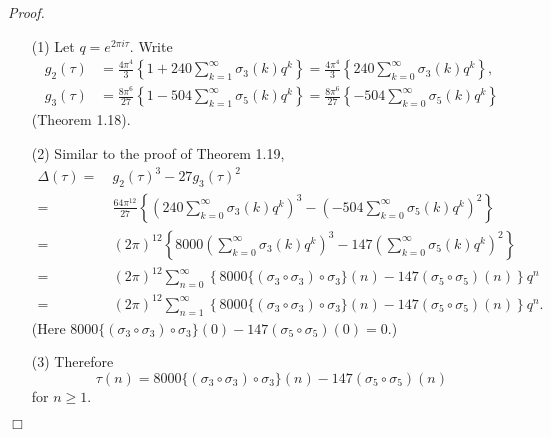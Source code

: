 \documentclass{article}
\begin{document}
\emph{Proof.}
\begin{enumerate}
\item[(1)]
  Let $q = e^{2 \pi i \tau}$.
  Write
  \begin{align*}
    g_2(\tau)
    &=
    \frac{4\pi^4}{3} \left\{ 1 + 240 \sum_{k=1}^{\infty} \sigma_3(k) q^k \right\}
    = \frac{4\pi^4}{3} \left\{ 240 \sum_{k=0}^{\infty} \sigma_3(k) q^k \right\}, \\
    g_3(\tau)
    &=
    \frac{8\pi^6}{27} \left\{ 1 - 504 \sum_{k=1}^{\infty} \sigma_5(k) q^k \right\}
    = \frac{8\pi^6}{27} \left\{ -504 \sum_{k=0}^{\infty} \sigma_5(k) q^k \right\}
  \end{align*}
  (Theorem 1.18).

\item[(2)]
  Similar to the proof of Theorem 1.19,
  \begin{align*}
    \Delta(\tau)
    =&\:
    g_2(\tau)^3 - 27 g_3(\tau)^2 \\
    =&\:
    \frac{64 \pi^{12}}{27}
      \left\{ \left( 240 \sum_{k=0}^{\infty} \sigma_3(k) q^k \right)^3
        - \left( -504 \sum_{k=0}^{\infty} \sigma_5(k) q^k \right)^2 \right\} \\
    =&\:
    (2\pi)^{12} \left\{ 8000 \left( \sum_{k=0}^{\infty} \sigma_3(k) q^k \right)^3
      - 147 \left( \sum_{k=0}^{\infty} \sigma_5(k) q^k \right)^2 \right\} \\
    =&\:
      (2\pi)^{12} \sum_{n=0}^{\infty}
        \left\{ 8000 \{ (\sigma_3 \circ \sigma_3) \circ \sigma_3 \}(n)
        - 147 ( \sigma_5 \circ \sigma_5 )(n) \right\} q^n \\
    =&\:
      (2\pi)^{12} \sum_{n=1}^{\infty}
        \left\{ 8000 \{ (\sigma_3 \circ \sigma_3) \circ \sigma_3 \}(n)
        - 147 ( \sigma_5 \circ \sigma_5 )(n) \right\} q^n.
  \end{align*}
  (Here $8000 \{ (\sigma_3 \circ \sigma_3) \circ \sigma_3 \}(0)
    - 147 ( \sigma_5 \circ \sigma_5 )(0) = 0$.)

\item[(3)]
  Therefore
  \[
    \tau(n)
    =
    8000 \{ (\sigma_3 \circ \sigma_3) \circ \sigma_3 \}(n)
      - 147 ( \sigma_5 \circ \sigma_5 )(n)
  \]
  for $n \geq 1$.
\end{enumerate}
$\Box$ \\\\



\end{document}
